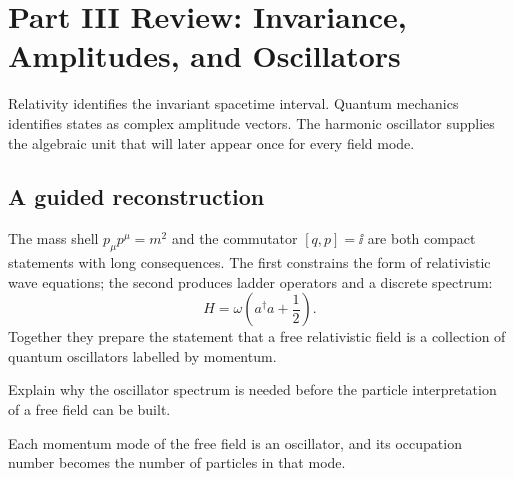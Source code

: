 
\chapter{Part III Review: Invariance, Amplitudes, and Oscillators}

Relativity identifies the invariant spacetime interval.  Quantum mechanics identifies states as complex amplitude vectors.  The harmonic oscillator supplies the algebraic unit that will later appear once for every field mode.

\section{A guided reconstruction}













The mass shell \(p_\mu p^\mu=m^2\) and the commutator \([q,p]=\ii\) are both compact statements with long consequences.  The first constrains the form of relativistic wave equations; the second produces ladder operators and a discrete spectrum:
\[
  H=\omega\left(a^\dagger a+\frac12\right).
\]
Together they prepare the statement that a free relativistic field is a collection of quantum oscillators labelled by momentum.

\begin{exercise}
Explain why the oscillator spectrum is needed before the particle interpretation of a free field can be built.
\begin{answer}
Each momentum mode of the free field is an oscillator, and its occupation number becomes the number of particles in that mode.
\end{answer}
\end{exercise}
